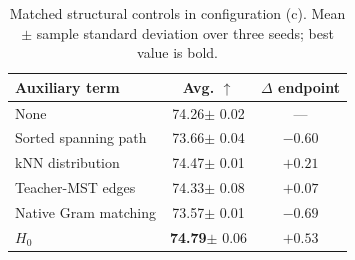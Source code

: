 \begin{table}[H]
    \centering
    \caption{Matched structural controls in configuration (c).
    Mean $\pm$ sample standard deviation over three seeds; best value is bold.}
    \label{tab:structural-controls}
    \small
    \newcommand{\scell}[2]{#1{\tiny $\pm$ #2}}
    \setlength{\tabcolsep}{4pt}
    \begin{tabular}{@{}lcc@{}}
        \toprule
        Auxiliary term & Avg. $\uparrow$ & $\Delta$ endpoint \\
        \midrule
        None & \scell{74.26}{0.02} & --- \\
        Sorted spanning path & \scell{73.66}{0.04} & $-0.60$ \\
        kNN distribution & \scell{{74.47}}{0.01} & $+0.21$ \\
        Teacher-MST edges & \scell{74.33}{0.08} & $+0.07$ \\
        Native Gram matching & \scell{73.57}{0.01} & $-0.69$ \\
        $H_0$ & \scell{\textbf{74.79}}{0.06} & $+0.53$ \\
        \bottomrule
    \end{tabular}
\end{table}
